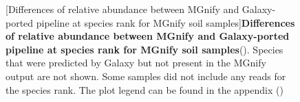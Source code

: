 \begin{figure}[H]
  \centering
  [Differences of relative abundance between MGnify and Galaxy-ported pipeline at species rank for MGnify soil samples]{\textbf{Differences of relative abundance between MGnify and Galaxy-ported pipeline at species rank for MGnify soil samples}(). Species that were predicted by Galaxy but not present in the MGnify output are not shown. Some samples did not include any reads for the species rank. The plot legend can be found in the appendix ()} \label{fig:mgnify_soil_rel_abundace_s_level}%
\end{figure}

